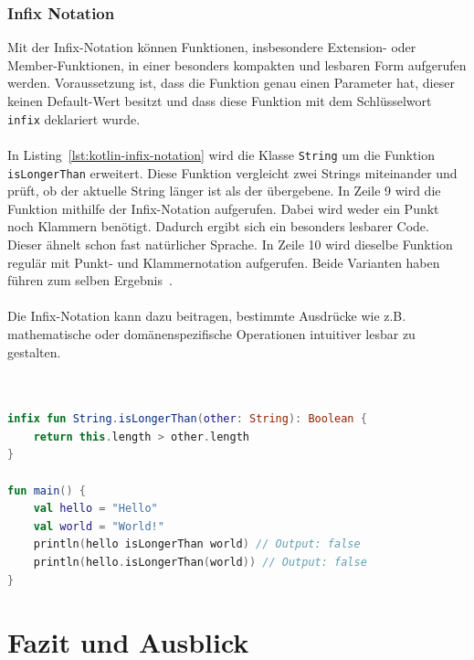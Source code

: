 \documentclass[11pt]{article}
\begin{document}
    \subsubsection{Infix Notation}
    Mit der Infix-Notation können Funktionen, insbesondere Extension- oder Member-Funktionen, in einer besonders kompakten und lesbaren Form aufgerufen werden.
    Voraussetzung ist, dass die Funktion genau einen Parameter hat, dieser keinen Default-Wert besitzt und dass diese Funktion mit dem Schlüsselwort \texttt{infix} deklariert wurde.\\
    \\
    In Listing~\ref{lst:kotlin-infix-notation} wird die Klasse \texttt{String} um die Funktion \texttt{isLongerThan} erweitert.
    Diese Funktion vergleicht zwei Strings miteinander und prüft, ob der aktuelle String länger ist als der übergebene.
    In Zeile 9 wird die Funktion mithilfe der Infix-Notation aufgerufen.
    Dabei wird weder ein Punkt noch Klammern benötigt.
    Dadurch ergibt sich ein besonders lesbarer Code.
    Dieser ähnelt schon fast natürlicher Sprache.
    In Zeile 10 wird dieselbe Funktion regulär mit Punkt- und Klammernotation aufgerufen.
    Beide Varianten haben führen zum selben Ergebnis~\cite{kotlin-infix-notation}.\\
    \\
    Die Infix-Notation kann dazu beitragen, bestimmte Ausdrücke wie z.B. mathematische oder domänenspezifische Operationen intuitiver lesbar zu gestalten.\\
    \\

    \begin{lstlisting}[language=Kotlin, caption={InfixNotation.kt}, label={lst:kotlin-infix-notation}]

infix fun String.isLongerThan(other: String): Boolean {
    return this.length > other.length
}

fun main() {
    val hello = "Hello"
    val world = "World!"
    println(hello isLongerThan world) // Output: false
    println(hello.isLongerThan(world)) // Output: false
}
    \end{lstlisting}

    \section{Fazit und Ausblick}
\end{document}

